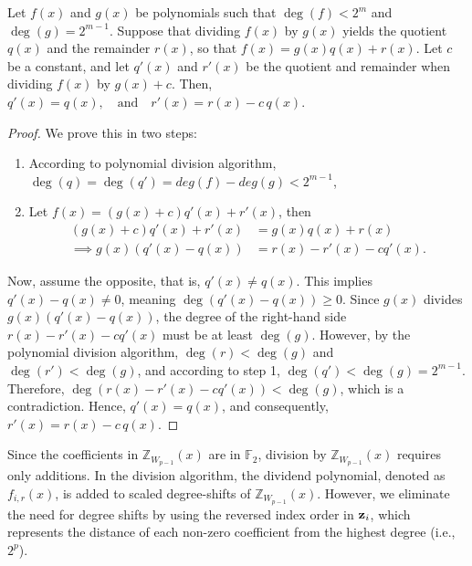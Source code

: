  \begin{proposition}\label{proposition:polynomial_division}
	     Let \( f(x) \) and \( g(x) \) be polynomials such that \( \deg(f) < 2^m \) and \( \deg(g) = 2^{m-1} \). Suppose that dividing \( f(x) \) by \( g(x) \) yields the quotient \( q(x) \) and the remainder \( r(x) \), so that
	     $
	     f(x) = g(x) q(x) + r(x).
	     $
	     Let \( c \) be a constant, and let \( q'(x) \) and \( r'(x) \) be the quotient and remainder when dividing \( f(x) \) by \( g(x) + c \). Then,
	     $
	     q'(x) = q(x), \quad \text{and} \quad r'(x) = r(x) - c\, q(x). 
	     $
	 \end{proposition}
\begin{proof}
	We prove this in two steps:
	\begin{enumerate}
		\item According to polynomial division algorithm, \(\deg(q) = \deg(q') = deg(f) - deg(g) < 2^{m-1}\),
		\item Let  $f(x) = (g(x)+c) q'(x) + r'(x)$, then
		\begin{align*}
			(g(x)+c) q'(x) + r'(x) &= g(x) q(x) + r(x)\\
			\implies g(x)(q'(x) - q(x)) &= r(x) - r'(x) - cq'(x).
		\end{align*}
	\end{enumerate}     
	Now, assume the opposite, that is, \( q'(x) \neq q(x) \). This implies \( q'(x) - q(x) \neq 0 \), meaning \( \deg(q'(x) - q(x)) \geq 0 \). Since \( g(x) \) divides \( g(x)(q'(x) - q(x)) \), the degree of the right-hand side \( r(x) - r'(x) - c q'(x) \) must be at least \( \deg(g) \).
	However, by the polynomial division algorithm, \( \deg(r) < \deg(g) \) and \( \deg(r') < \deg(g) \), and according to step 1, \( \deg(q') < \deg(g) = 2^{m-1} \). Therefore, \( \deg(r(x) - r'(x) - c q'(x)) < \deg(g) \), which is a contradiction.
	Hence, \( q'(x) = q(x) \), and consequently, \( r'(x) = r(x) - c\, q(x) \).
\end{proof}


Since the coefficients in $\mathbb{Z}_{W_{p-1}}(x)$ are in $\mathbb{F}_2$, division by $\mathbb{Z}_{W_{p-1}}(x)$ requires only additions. In the division algorithm, the dividend polynomial, denoted as $f_{i,r}(x)$, is added to scaled degree-shifts of $\mathbb{Z}_{W_{p-1}}(x)$. However, we eliminate the need for degree shifts by using the reversed index order in ${\bf{z}}_i$, which represents the distance of each non-zero coefficient from the highest degree (i.e., $2^p$). 

